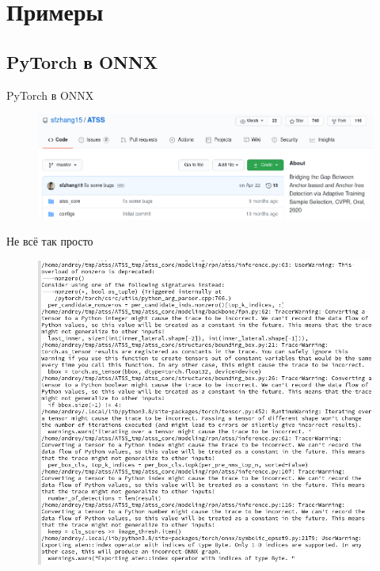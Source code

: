 \documentclass[mathserif,serif,unicode]{beamer}
\begin{document}
\section{Примеры}

\subsection{PyTorch в ONNX}

\begin{frame}{PyTorch в ONNX}

\begin{block}{}
    \begin{figure}
        \centering
        \includegraphics[width=\textwidth]{images/atss.png}
    \end{figure}
\end{block}
    
\end{frame}

\begin{frame}{Не всё так просто}
\begin{block}{}
\begin{figure}
    \centering
    \includegraphics[width=\textwidth]{images/conv_warn.png}
\end{figure}
\end{block}
\end{frame}
\end{document}
